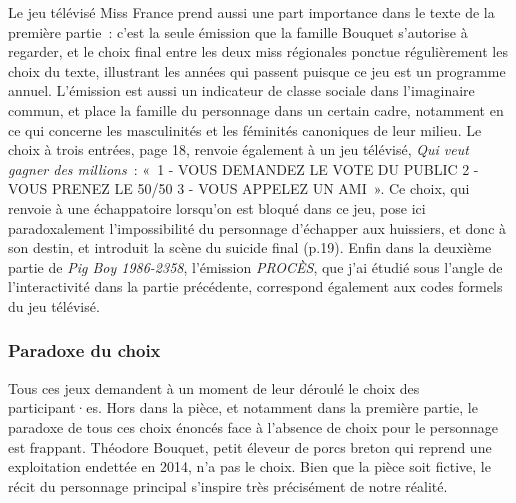 \documentclass[
]{article}
\begin{document}
Le jeu télévisé Miss France prend aussi une part importance dans le texte de la première partie~: c'est la seule émission que la famille Bouquet s'autorise à regarder, et le choix final entre les deux miss régionales ponctue régulièrement les choix du texte, illustrant les années qui passent puisque ce jeu est un programme annuel. L'émission est aussi un indicateur de classe sociale dans l'imaginaire commun, et place la famille du personnage dans un certain cadre, notamment en ce qui concerne les masculinités et les féminités canoniques de leur milieu. Le choix à trois entrées, page 18, renvoie également à un jeu télévisé, \emph{Qui veut gagner des millions~}: «~1 - VOUS DEMANDEZ LE VOTE DU PUBLIC 2 - VOUS PRENEZ LE 50/50 3 - VOUS APPELEZ UN AMI~». Ce choix, qui renvoie à une échappatoire lorsqu'on est bloqué dans ce jeu, pose ici paradoxalement l'impossibilité du personnage d'échapper aux huissiers, et donc à son destin, et introduit la scène du suicide final (p.19). Enfin dans la deuxième partie de \emph{Pig Boy 1986-2358}, l'émission \emph{PROCÈS}, que j'ai étudié sous l'angle de l'interactivité dans la partie précédente, correspond également aux codes formels du jeu télévisé.

\subsubsection{Paradoxe du choix}\label{paradoxe-du-choix}

Tous ces jeux demandent à un moment de leur déroulé le choix des participant·es. Hors dans la pièce, et notamment dans la première partie, le paradoxe de tous ces choix énoncés face à l'absence de choix pour le personnage est frappant. Théodore Bouquet, petit éleveur de porcs breton qui reprend une exploitation endettée en 2014, n'a pas le choix. Bien que la pièce soit fictive, le récit du personnage principal s'inspire très précisément de notre réalité.
\end{document}
